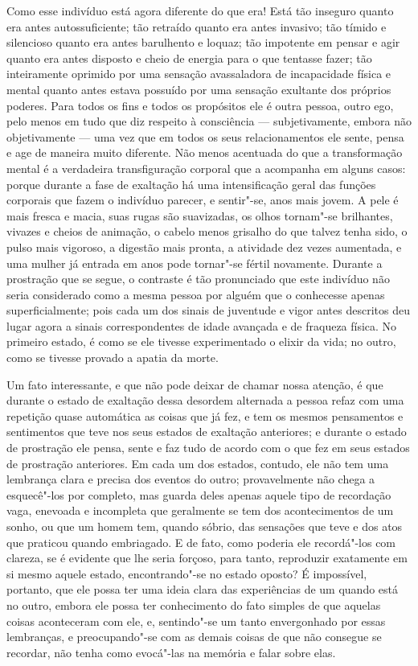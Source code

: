 Como esse indivíduo está agora diferente do que era!  Está tão inseguro
quanto era antes autossuficiente; tão retraído quanto era antes
invasivo; tão tímido e silencioso quanto era antes barulhento e loquaz;
tão impotente em pensar e agir quanto era antes disposto e cheio de
energia para o que tentasse fazer; tão inteiramente oprimido por uma
sensação avassaladora de incapacidade física e mental quanto antes
estava possuído por uma sensação exultante dos próprios poderes.  Para
todos os fins e todos os propósitos ele é outra pessoa, outro ego, pelo
menos em tudo que diz respeito à consciência --- subjetivamente, embora
não objetivamente --- uma vez que em todos os seus relacionamentos ele
sente, pensa e age de maneira muito diferente.  Não menos acentuada do
que a transformação mental é a verdadeira transfiguração corporal que a
acompanha em alguns casos: porque durante a fase de exaltação há uma
intensificação geral das funções corporais que fazem o indivíduo
parecer, e sentir"-se, anos mais jovem.  A pele é mais fresca e macia,
suas rugas são suavizadas, os olhos tornam"-se brilhantes, vivazes e
cheios de animação, o cabelo menos grisalho do que talvez tenha sido, o
pulso mais vigoroso, a digestão mais pronta, a atividade dez vezes
aumentada, e uma mulher já entrada em anos pode tornar"-se fértil
novamente.  Durante a prostração que se segue, o contraste é tão
pronunciado que este indivíduo não seria considerado como a mesma
pessoa por alguém que o conhecesse apenas superficialmente; pois cada
um dos sinais de juventude e vigor antes descritos deu lugar agora a
sinais correspondentes de idade avançada e de fraqueza física.  No
primeiro estado, é como se ele tivesse experimentado o elixir da vida;
no outro, como se tivesse provado a apatia da morte. 

Um fato interessante, e que não pode deixar de chamar nossa atenção, é
que durante o estado de exaltação dessa desordem alternada a pessoa refaz
com uma repetição quase automática as coisas que já fez, e tem os mesmos
pensamentos e sentimentos que teve nos seus estados de exaltação
anteriores; e durante o estado de prostração ele pensa, sente e faz
tudo de acordo com o que fez em seus estados de prostração anteriores.
Em cada um dos estados, contudo, ele não tem uma lembrança clara e
precisa dos eventos do outro; provavelmente não chega a esquecê"-los por
completo, mas guarda deles apenas aquele tipo de recordação vaga,
enevoada e incompleta que geralmente se tem dos acontecimentos de um
sonho, ou que um homem tem, quando sóbrio, das sensações que teve e dos
atos que praticou quando embriagado.  E de fato, como poderia ele
recordá"-los com clareza, se é evidente que lhe seria forçoso, para
tanto, reproduzir exatamente em si mesmo aquele estado, encontrando"-se
no estado oposto? É impossível, portanto, que ele possa ter uma ideia
clara das experiências de um quando está no outro, embora ele possa ter
conhecimento do fato simples de que aquelas coisas aconteceram com ele,
e, sentindo"-se um tanto envergonhado por essas lembranças, e
preocupando"-se com as demais coisas de que não consegue se recordar,
não tenha como evocá"-las na memória e falar sobre elas.

